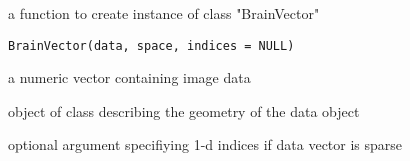 \begin{Description}\relax
a function to create instance of class "BrainVector"
\end{Description}
\begin{Usage}
\begin{verbatim}
BrainVector(data, space, indices = NULL)
\end{verbatim}
\end{Usage}
\begin{Arguments}
\begin{ldescription}
\item[\code{data}] a numeric vector containing image data 
\item[\code{space}] object of class  describing the
geometry of the data object 
\item[\code{indices}] optional argument specifiying 1-d indices if data
vector is sparse 
\end{ldescription}
\end{Arguments}

